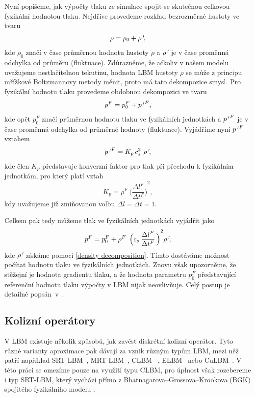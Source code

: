 Nyní popíšeme, jak výpočty tlaku ze simulace spojit se skutečnou celkovou fyzikální hodnotou tlaku. Nejdříve provedeme rozklad bezrozměrné hustoty ve tvaru
\begin{equation}\label{density decomposition}
	\rho  = \rho _0 + \rho \textit{\textquotesingle},
\end{equation}
kde $ \rho_0 $ značí v čase průměrnou hodnotu hustoty $ \rho $ a $ \rho \textit{\textquotesingle} $ je v čase proměnná odchylka od průměru (fluktuace). Zdůrazněme, že ačkoliv v našem modelu uvažujeme nestlačitelnou tekutinu, hodnota LBM hustoty $ \rho $ se může z principu mřížkové Boltzmannovy metody měnit, proto má tato dekompozice smysl. Pro fyzikální hodnotu tlaku provedeme obdobnou dekompozici ve tvaru
\begin{equation}\label{pressure decomposition}
p^{F} = p_0^{F} + p\textit{\textquotesingle}^{\,F},
\end{equation}
kde opět $ p_0^F $ značí průměrnou hodnotu tlaku ve fyzikálních jednotkách a $ p\textit{\textquotesingle}^{\,F} $ je v čase proměnná odchylka od průměrné hodnoty (fluktuace). Vyjádříme nyní $ p\textit{\textquotesingle}^{\,F} $ vztahem
\begin{equation}\label{pressure devation}
p\textit{\textquotesingle}^{\,F} = K_{p} \, c^{2}_{s}\ \rho \textit{\textquotesingle},
\end{equation}
kde člen $ K_{p} $ představuje konverzní faktor pro tlak při přechodu k fyzikálním jednotkám, pro který platí vztah
\begin{equation}\label{cp}
K_{p} = \rho^{F} \ {\Big( \dfrac{\Delta l^{F}}{\Delta t^{F}} \Big)}^2,
\end{equation}
kdy uvažujeme již zmiňovanou volbu $ \Delta l = \Delta t = 1 $.

Celkem pak tedy můžeme tlak ve fyzikálních jednotkách vyjádřit jako
\begin{equation}\label{total pressure}
p^F = p^F_0 + \rho^F \ {\, \Big(c_{s} \: \dfrac{\Delta l^F}{\Delta t^F} \,\Big)}^2 \rho \textit{\textquotesingle},
\end{equation}
kde $ \rho \textit{\textquotesingle} $ získáme pomocí \eqref{density decomposition}. Tímto dostáváme možnost počítat hodnotu tlaku ve fyzikálních jednotkách. Znovu však upozorněme, že stěžejní je hodnota gradientu tlaku, a že hodnota parametru $ p^F_0 $ představující referenční hodnotu tlaku výpočty v LBM nijak neovlivňuje. Celý postup je detailně popsán~v~\cite{Kruger}.

\subsection{Kolizní operátory}\label{kol}
V LBM existuje několik způsobů, jak zavést diskrétní kolizní operátor. Tyto různé varianty aproximace pak dávají za vznik různým typům LBM, mezi něž patří například SRT-LBM~\cite{GeierCuLBM}, MRT-LBM~\cite{MRT}, CLBM~ \cite{GeierCLBM}, ELBM~\cite{ELBM} nebo CuLBM~\cite{GeierCuLBM}. V této práci se omezíme pouze na využití typu CLBM, pro úplnost však rozebereme i typ SRT-LBM, který vychází přímo z Bhatnagarova–Grossova–Krookova (BGK) spojitého fyzikálního modelu \cite{Kruger}.

